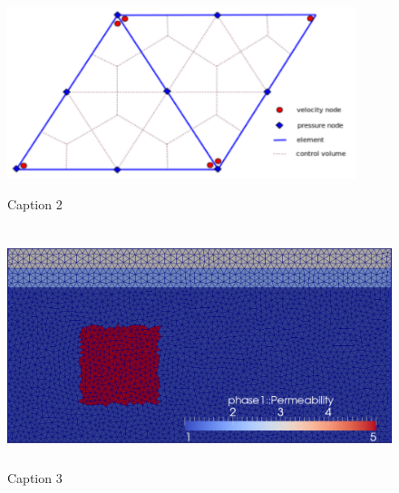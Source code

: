 \documentclass[preprint,authoryear,12pt]{elsarticle}
\begin{document}

 

\begin{figure}[h]
 
\begin{center}
\centering
\includegraphics[width=0.75\linewidth, height=5cm]{./Pics/P1DG-P2_element_type} 
\caption{Caption 2}
\label{fig:2}
\end{center}

\begin{center}
\centering
\includegraphics[width=0.8\linewidth, height=7cm]{./Pics/4r_po_adapt_fine_125_mesh} 
\caption{Caption 3}
\label{fig:3}
\end{center}


\end{figure}
\end{document}
